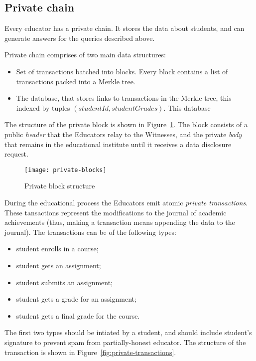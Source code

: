 \subsection{Private chain}
\label{sec:priv-chain}

Every educator has a private chain. It stores the data about students, and can generate answers for the queries described above.

Private chain comprises of two main data structures:
\begin{itemize}
\item Set of transactions batched into blocks. Every block contains a list of transactions packed into a Merkle tree.
\item The database, that stores links to transactions in the Merkle tree, this indexed by tuples $(studentId, studentGrades)$. This database 
\end{itemize}

The structure of the private block is shown in Figure~\ref{fig:privateblocks}. The block consists of a public \textit{header} that the Educators relay to the Witnesses, and the private \textit{body} that remains in the educational institute until it receives a data disclosure request.

\begin{figure}[ht]
\centering
\texttt{[image: private-blocks]}
\caption{Private block structure}
\label{fig:privateblocks}
\end{figure}

During the educational process the Educators emit atomic \textit{private transactions}. These tansactions represent the modifications to the journal of academic achievements (thus, making a transaction means appending the data to the journal). The transactions can be of the following types:
\begin{itemize}
\item student enrolls in a course;
\item student gets an assignment;
\item student submits an assignment;
\item student gets a grade for an assignment;
\item student gets a final grade for the course.
\end{itemize}

The first two types should be intiated by a student, and should include student's signature to prevent spam from partially-honest educator.
The structure of the transaction is shown in Figure~\ref{fig:private-transactions}.


